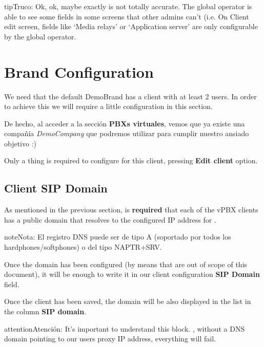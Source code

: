 \documentclass[letterpaper,10pt,spanish]{sphinxmanual}
\begin{document}
\begin{notice}{tip}{Truco:}
Ok, ok, maybe exactly is not totally accurate. The global operator is
able to see some fields in some screens that other admins can't (i.e. On
Client edit screen, fields like `Media relays' or `Application server' are
only configurable by the global operator.
\end{notice}


\section{Brand Configuration}
\label{getting_started/internal_calls/brand_portal::doc}\label{getting_started/internal_calls/brand_portal:brand-configuration}
We need that the default DemoBrand has a client with at least 2 users. In
order to achieve this we will require a little configuration in this section.

De hecho, al acceder a la sección \textbf{PBXs virtuales}, vemos que ya existe una compañía \emph{DemoCompany} que podremos utilizar para cumplir nuestro ansiado objetivo :)

Only a thing is required to configure for this client, pressing \textbf{Edit client} option.


\subsection{Client SIP Domain}
\label{getting_started/internal_calls/brand_portal:domain-per-client}\label{getting_started/internal_calls/brand_portal:client-sip-domain}
As mentioned in the previous section, is \textbf{required} that each of the vPBX clients
has a public domain that resolves to the configured IP address for
{\hyperref[administration_portal/platform/infrastructure/proxy_users:proxyusers]{}}.

\begin{notice}{note}{Nota:}
El registro DNS puede ser de tipo A (soportado por todos los hardphones/softphones) o del tipo NAPTR+SRV.
\end{notice}

Once the domain has been configured (by means that are out of scope of this
document), it will be enough to write it in our client configuration \textbf{SIP Domain} field.

Once the client has been saved, the domain will be also displayed in the list in the column \textbf{SIP domain}.

\begin{notice}{attention}{Atención:}
It's important to understand this block. {\hyperref[getting_started/internal_calls/brand_portal:dnshack]{}}, without a DNS domain pointing to our
users proxy IP address, everything will fail.
\end{notice}
\end{document}
